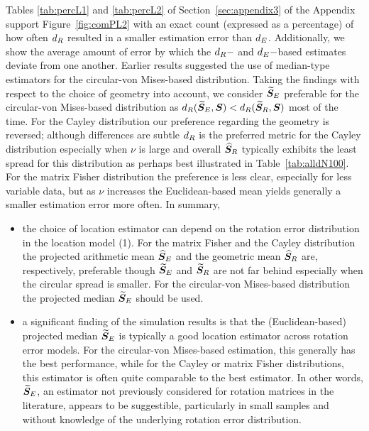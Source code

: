 Tables \ref{tab:percL1} and \ref{tab:percL2} of Section~\ref{sec:appendix3} of the Appendix support Figure~\ref{fig:comPL2} with an exact count (expressed as a percentage) of how often ${d_R}$ resulted in a smaller estimation error than ${d_E}$.  Additionally, we show the average amount of error by which the ${d_R}-$ and ${d_E}-$based estimates deviate from one another.   
Earlier results suggested the use of median-type estimators for the circular-von Mises-based distribution. Taking the findings with respect to the choice of geometry into account, we consider ${\widetilde{\bm S}_E}$ preferable for the circular-von Mises-based distribution as ${d_R}({\widetilde{\bm S}_E},\bm S) < {d_R}({\widetilde{\bm S}_R},\bm S)$ most of the time.  For the Cayley distribution our preference regarding the geometry is reversed; although differences are subtle ${d_R}$ is the preferred metric for the Cayley distribution especially when $\nu$ is large and overall ${\widehat{\bm S}_R}$ typically exhibits the least spread for this distribution as perhaps best illustrated in Table~\ref{tab:alldN100}.   For the  matrix Fisher distribution the preference is less clear, especially for less variable data, but as $\nu$ increases the Euclidean-based mean yields generally a smaller estimation error more often. In summary,
\begin{itemize}
\item the choice of location estimator can depend on the rotation error distribution in the location model (1).  For the matrix Fisher and the Cayley distribution  the projected arithmetic mean ${\widehat{\bm S}_E}$ and the geometric mean ${\widehat{\bm S}_R}$ are, respectively, preferable though ${\widetilde{\bm S}_E}$ and ${\widetilde{\bm S}_R}$ are not far behind especially when the circular spread is smaller. For the circular-von Mises-based distribution  the projected median ${\widetilde{\bm S}_E}$  should be used.

\item   a significant finding of the simulation results is that the (Euclidean-based)  projected median ${\widetilde{\bm S}_E}$ is typically a good location estimator across rotation error models.  For the circular-von Mises-based estimation, this generally has the best performance, while for the Cayley or matrix Fisher distributions, this estimator is often quite comparable to the best estimator.  In other words, ${\widetilde{\bm S}_E}$, an estimator  not previously considered for rotation matrices in the literature, appears to be suggestible, particularly in small samples and without knowledge of the underlying rotation error distribution.

\end{itemize}
